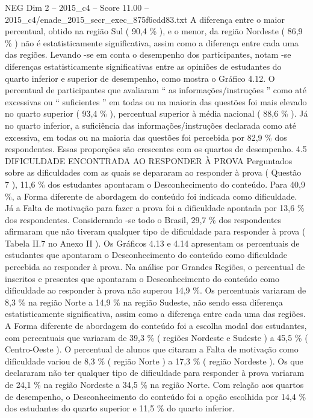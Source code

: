 \begin{textsample}{NEG Dim 2 – 2015\_c4 – Score 11.00 – 2015\_c4/enade\_2015\_secr\_exec\_875f6cdd83.txt}
A diferença entre o maior percentual, obtido na região Sul ( 90,4 \% ), e o menor, da região Nordeste ( 86,9 \% ) não é estatisticamente significativa, assim como a diferença entre cada uma das regiões.
Levando -se em conta o desempenho dos participantes, notam -se diferenças estatisticamente significativas entre as opiniões de estudantes do quarto inferior e superior de desempenho, como mostra o Gráfico 4.12.
O percentual de participantes que avaliaram “ as informações/instruções ” como até excessivas ou “ suficientes ” em todas ou na maioria das questões foi mais elevado no quarto superior ( 93,4 \% ), percentual superior à média nacional ( 88,6 \% ).
Já no quarto inferior, a suficiência das informações/instruções declarada como até excessiva, em todas ou na maioria das questões foi percebida por 82,9 \% dos respondentes.
Essas proporções são crescentes com os quartos de desempenho. 4.5 DIFICULDADE ENCONTRADA AO RESPONDER À PROVA Perguntados sobre as dificuldades com as quais se depararam ao responder à prova ( Questão 7 ), 11,6 \% dos estudantes apontaram o Desconhecimento do conteúdo.
Para 40,9 \%, a Forma diferente de abordagem do conteúdo foi indicada como dificuldade.
Já a Falta de motivação para fazer a prova foi a dificuldade apontada por 13,6 \% dos respondentes.
Considerando -se todo o Brasil, 29,7 \% dos respondentes afirmaram que não tiveram qualquer tipo de dificuldade para responder à prova ( Tabela II.7 no Anexo II ).
Os Gráficos 4.13 e 4.14 apresentam os percentuais de estudantes que apontaram o Desconhecimento do conteúdo como dificuldade percebida ao responder à prova.
Na análise por Grandes Regiões, o percentual de inscritos e presentes que apontaram o Desconhecimento do conteúdo como dificuldade ao responder à prova não superou 14,9 \%.
Os percentuais variaram de 8,3 \% na região Norte a 14,9 \% na região Sudeste, não sendo essa diferença estatisticamente significativa, assim como a diferença entre cada uma das regiões.
A Forma diferente de abordagem do conteúdo foi a escolha modal dos estudantes, com percentuais que variaram de 39,3 \% ( regiões Nordeste e Sudeste ) a 45,5 \% ( Centro-Oeste ).
O percentual de alunos que citaram a Falta de motivação como dificuldade variou de 8,3 \% ( região Norte ) a 17,3 \% ( região Nordeste ).
Os que declararam não ter qualquer tipo de dificuldade para responder à prova variaram de 24,1 \% na região Nordeste a 34,5 \% na região Norte.
Com relação aos quartos de desempenho, o Desconhecimento do conteúdo foi a opção escolhida por 14,4 \% dos estudantes do quarto superior e 11,5 \% do quarto inferior.

\end{textsample}
